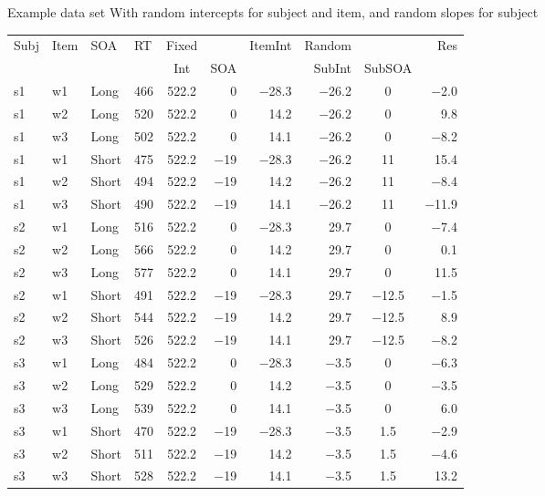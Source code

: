 \documentclass{beamer}
\begin{document}
\begin{frame}{Example data set}
  \scriptsize
With random intercepts for subject and item, and random slopes for
  subject\\[1.5ex]
  \begin{tabular}{llllcrrrcr}
    \hline
    Subj & Item & SOA & RT & Fixed && ItemInt & Random && Res \\
    \cline{5-6}
    \cline{8-10}
    & & & & Int & SOA && SubInt & SubSOA & \\
    \hline
    s1 & w1 & Long  & 466 & 522.2 & 0     & $-$28.3 & $-$26.2 & 0       & $-$2.0 \\
    s1 & w2 & Long  & 520 & 522.2 & 0     & 14.2    & $-$26.2 & 0       & 9.8 \\
    s1 & w3 & Long  & 502 & 522.2 & 0     & 14.1    & $-$26.2 & 0       & $-$8.2 \\
    s1 & w1 & Short & 475 & 522.2 & $-$19 & $-$28.3 & $-$26.2 & 11      & 15.4 \\
    s1 & w2 & Short & 494 & 522.2 & $-$19 & 14.2    & $-$26.2 & 11      & $-$8.4 \\
    s1 & w3 & Short & 490 & 522.2 & $-$19 & 14.1    & $-$26.2 & 11      & $-$11.9 \\
    s2 & w1 & Long  & 516 & 522.2 & 0     & $-$28.3 & 29.7    & 0       & $-$7.4 \\
    s2 & w2 & Long  & 566 & 522.2 & 0     & 14.2    & 29.7    & 0       & 0.1 \\
    s2 & w3 & Long  & 577 & 522.2 & 0     & 14.1    & 29.7    & 0       & 11.5 \\
    s2 & w1 & Short & 491 & 522.2 & $-$19 & $-$28.3 & 29.7    & $-$12.5 & $-$1.5 \\
    s2 & w2 & Short & 544 & 522.2 & $-$19 & 14.2    & 29.7    & $-$12.5 & 8.9 \\
    s2 & w3 & Short & 526 & 522.2 & $-$19 & 14.1    & 29.7    & $-$12.5 & $-$8.2 \\
    s3 & w1 & Long  & 484 & 522.2 & 0     & $-$28.3 & $-$3.5  & 0       & $-$6.3 \\
    s3 & w2 & Long  & 529 & 522.2 & 0     & 14.2    & $-$3.5  & 0       & $-$3.5 \\
    s3 & w3 & Long  & 539 & 522.2 & 0     & 14.1    & $-$3.5  & 0       & 6.0 \\
    s3 & w1 & Short & 470 & 522.2 & $-$19 & $-$28.3 & $-$3.5  & 1.5     & $-$2.9 \\
    s3 & w2 & Short & 511 & 522.2 & $-$19 & 14.2    & $-$3.5  & 1.5     & $-$4.6 \\
    s3 & w3 & Short & 528 & 522.2 & $-$19 & 14.1    & $-$3.5  & 1.5     & 13.2 \\
    \hline
  \end{tabular}
\end{frame}
\end{document}
